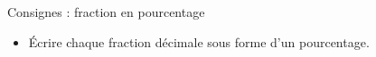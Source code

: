 \documentclass[17pt]{flash}
\begin{document}
\flashvisibletimertrue
\FlashSetItemSep{25pt}
\FlashSetVtop{-2em}

\begin{frame}{Consignes : fraction en pourcentage}
    \begin{itemize}
        \item Écrire chaque fraction décimale sous forme d'un pourcentage.
    \end{itemize}
\end{frame}

\AtCorrection{\small}
\end{document}
